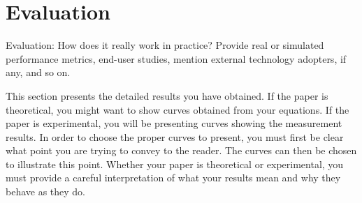 \section{Evaluation}\label{sec:evaluation} 


Evaluation: How does it really work in practice? Provide real or simulated
performance metrics, end-user studies, mention external technology adopters,
if any, and so on.

This section presents the detailed results you have obtained. If the paper
is theoretical, you might want to show curves obtained from your equations.
If the paper is experimental, you will be presenting curves showing the
measurement results. In order to choose the proper curves to present, you
must first be clear what point you are trying to convey to the reader. The 
curves can then be chosen to illustrate this point. Whether your paper is
theoretical or experimental, you must provide a careful interpretation of
what your results mean and why they behave as they do.

